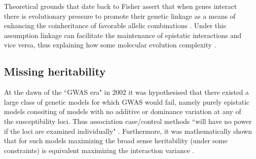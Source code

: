 Theoretical grounds that date back to Fisher assert that when genes interact there is evolutionary pressure to promote their genetic linkage as a means of enhancing the coinheritance of favorable allelic combinations \cite{petkov2005evidence:REF_FISHER}.
Under this assumption linkage can facilitate the maintenance of epistatic interactions and vice versa, thus explaining how some molecular evolution complexity \cite{phillips2008epistasis}.


\subsection{Missing heritability}

At the dawn of the ``GWAS era" in 2002 it was hypothesised that there existed a large class of genetic models for which GWAS would fail, namely purely epistatic models conssiting of models with no additive or dominance variation at any of the susceptibility loci. 
Thus association case/control methods ``will have no power if the loci are examined individually" \cite{culverhouse2002perspective}.
Furthermore, it was mathematically shown that for such models maximizing the broad sense heritability (under some constraints) is equivalent maximizing the interaction variance \cite{culverhouse2002perspective}.

